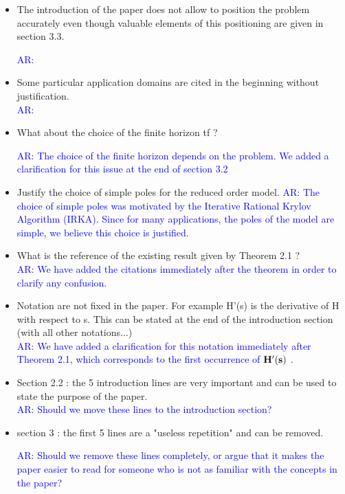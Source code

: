 \documentclass[11pt]{article}
\def\serkan#1{\textcolor{blue}{{#1}}}
\begin{document}
\begin{itemize}
\item The introduction of the paper does not allow to position the problem
accurately even though valuable elements of this positioning are given
in section 3.3. 

\serkan{\textsf{AR}:   }  

\item Some particular application domains are cited in the beginning without
justification. \\
\serkan{\textsf{AR}:   }  
\item What about the choice of the finite horizon tf ?

\serkan{\textsf{AR}: The choice of the finite horizon depends on the problem. We added a clarification for this issue at the end of section 3.2}

\item Justify the choice of simple poles for the reduced order model. 
\serkan{\textsf{AR}:  The choice of simple poles was motivated by the Iterative Rational Krylov Algorithm (IRKA). Since for many applications, the poles of the model are simple, we believe this choice is justified. }  

\item What is the reference of the existing result given by Theorem 2.1 ? \\
\serkan{\textsf{AR}:  We have added the citations immediately after the theorem in order to clarify any confusion. }  

\item Notation are not fixed in the paper. For example H'(s) is the
derivative of H with respect to s. This can be stated at the end of the
introduction section (with all other notations...)\\
\serkan{\textsf{AR}:  We have added a clarification for this notation immediately after Theorem 2.1, which corresponds to the first occurrence of $\bf{H}'(s)$ .} 

\item  Section 2.2 : the 5 introduction lines are very important and can be
used to state the purpose of the paper.  \\
\serkan{\textsf{AR}:  Should we move these lines to the introduction section?}

\item section 3 : the first 5 lines are a "useless repetition" and can be
removed. 

\serkan{\textsf{AR}:  Should we remove these lines completely, or argue that it makes the paper easier to read for someone who is not as familiar with the concepts in the paper? }



\end{itemize}
\end{document}
